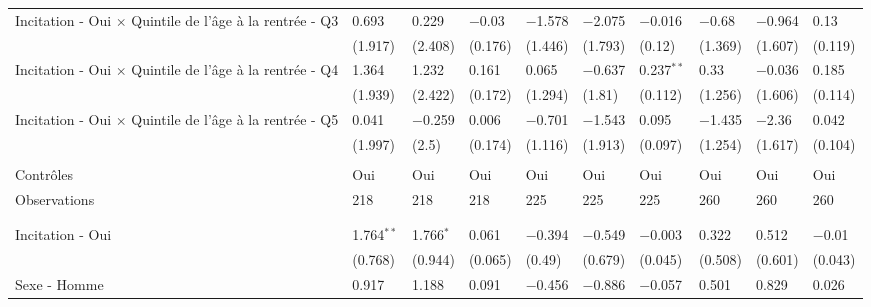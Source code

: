 \documentclass[
]{book}
\begin{document}
\begin{landscape}
\begin{ThreePartTable}
\begin{longtable}[t]{llllllllll}
\hspace{1em}Incitation - Oui $\times$ Quintile de l'âge à la rentrée - Q3 & 0.693 & 0.229 & $-$0.03 & $-$1.578 & $-$2.075 & $-$0.016 & $-$0.68 & $-$0.964 & 0.13\\
\hspace{1em} & (1.917) & (2.408) & (0.176) & (1.446) & (1.793) & (0.12) & (1.369) & (1.607) & (0.119)\\
\hspace{1em}Incitation - Oui $\times$ Quintile de l'âge à la rentrée - Q4 & 1.364 & 1.232 & 0.161 & 0.065 & $-$0.637 & 0.237$^{**}$ & 0.33 & $-$0.036 & 0.185\\
\hspace{1em} & (1.939) & (2.422) & (0.172) & (1.294) & (1.81) & (0.112) & (1.256) & (1.606) & (0.114)\\
\hspace{1em}Incitation - Oui $\times$ Quintile de l'âge à la rentrée - Q5 & 0.041 & $-$0.259 & 0.006 & $-$0.701 & $-$1.543 & 0.095 & $-$1.435 & $-$2.36 & 0.042\\
\hspace{1em} & (1.997) & (2.5) & (0.174) & (1.116) & (1.913) & (0.097) & (1.254) & (1.617) & (0.104)\\
\hspace{1em} &  &  &  &  &  &  &  &  \vphantom{6} & \\
\hspace{1em}Contrôles & Oui & Oui & Oui & Oui & Oui & Oui & Oui & Oui & \vphantom{3} Oui\\
\hspace{1em}Observations & 218 & 218 & 218 & 225 & 225 & 225 & 260 & 260 & \vphantom{3} 260\\
\hspace{1em} &  &  &  &  &  &  &  &  \vphantom{5} & \\
\addlinespace[0.3em]
\multicolumn{10}{l}{\textbf{Panel D : Hétérogénéité en fonction du sexe}}\\
\hline
\hspace{1em}Incitation - Oui & 1.764$^{**}$ & 1.766$^{*}$ & 0.061 & $-$0.394 & $-$0.549 & $-$0.003 & 0.322 & 0.512 & $-$0.01\\
\hspace{1em} & (0.768) & (0.944) & (0.065) & (0.49) & (0.679) & (0.045) & (0.508) & (0.601) & (0.043)\\
\hspace{1em}Sexe - Homme & 0.917 & 1.188 & 0.091 & $-$0.456 & $-$0.886 & $-$0.057 & 0.501 & 0.829 & 0.026\\

\end{longtable}
\end{ThreePartTable}
\end{landscape}
\end{document}
